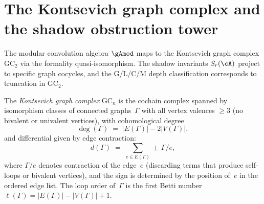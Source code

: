 
\section{The Kontsevich graph complex and the shadow obstruction tower}
\label{sec:graph-complex-shadow}

The modular convolution algebra $\gAmod$ maps to the Kontsevich
graph complex $\mathrm{GC}_2$ via the formality quasi-isomorphism.
The shadow invariants $S_r(\cA)$ project to specific graph cocycles,
and the G/L/C/M depth classification corresponds to truncation in
$\mathrm{GC}_2$.

\begin{definition}
\label{def:graph-complex-gcn}
The \emph{Kontsevich graph complex} $\mathrm{GC}_n$ is the cochain
complex spanned by isomorphism classes of connected graphs~$\Gamma$
with all vertex valences $\geq 3$ (no bivalent or univalent vertices),
with cohomological degree
\[
\deg(\Gamma) \;=\; |E(\Gamma)| - 2|V(\Gamma)|,
\]
and differential given by edge contraction:
\begin{equation}\label{eq:gc-differential}
d(\Gamma) \;=\; \sum_{e \in E(\Gamma)} \pm\, \Gamma/e,
\end{equation}
where $\Gamma/e$ denotes contraction of the edge~$e$ (discarding
terms that produce self-loops or bivalent vertices), and the sign is
determined by the position of~$e$ in the ordered edge list. The loop
order of~$\Gamma$ is the first Betti number
$\ell(\Gamma) = |E(\Gamma)| - |V(\Gamma)| + 1$.
\end{definition}

